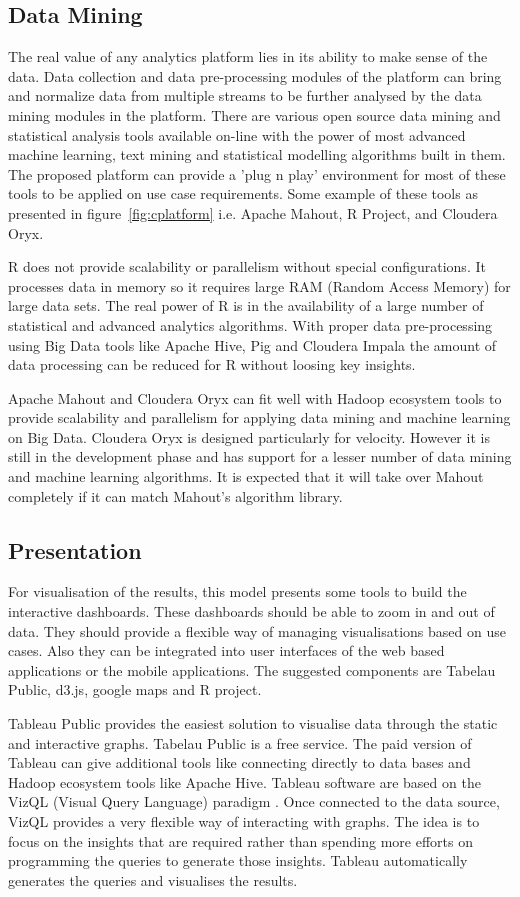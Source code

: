 \subsection{Data Mining}
The real value of any analytics platform lies in its ability to make sense of the data. Data collection and data pre-processing modules of the platform can bring and normalize data from multiple streams to be further analysed by the data mining modules in the platform. There are various open source data mining and statistical analysis tools available on-line with the power of most advanced machine learning, text mining and statistical modelling algorithms built in them.  The proposed platform can provide a 'plug n play' environment for most of these tools to be applied on use case requirements. Some example of these tools as presented in figure~\ref{fig:cplatform} i.e. Apache Mahout, R Project, and Cloudera Oryx. 

R does not provide scalability or parallelism without special configurations. It processes data in memory so it requires large RAM (Random Access Memory) for large data sets. The real power of R is in the availability of a large number of statistical and advanced analytics algorithms. With proper data pre-processing using Big Data tools like Apache Hive, Pig and Cloudera Impala the amount of data processing can be reduced for R without loosing key insights.

 Apache Mahout and Cloudera Oryx can fit well with Hadoop ecosystem tools to provide scalability and parallelism for applying data mining and machine learning on Big Data. Cloudera Oryx is designed particularly for velocity. However it is still in the development phase and has support for a lesser number of data mining and machine learning algorithms. It is expected that it will take over Mahout completely if it can match Mahout's algorithm library.  
\subsection{Presentation}  
For visualisation of the results, this model presents some tools to build the interactive dashboards. These dashboards should be able to zoom in and out of data. They should provide a flexible way of managing visualisations based on use cases. Also they can be integrated into user interfaces of the web based applications or the mobile applications. The suggested components are Tabelau Public, d3.js, google maps and R project.

Tableau Public provides the easiest solution to visualise data through the static and interactive graphs. Tabelau Public is a free service. The paid version of Tableau can give additional tools like connecting directly to data bases and Hadoop ecosystem tools like Apache Hive. Tableau software are based on the VizQL (Visual Query Language) paradigm \cite{hanrahan2006vizql}. Once connected to the data source, VizQL  provides a very flexible way of interacting with graphs. The idea is to focus on the insights that are required rather than spending more efforts on programming the queries to generate those insights. Tableau automatically generates the queries and visualises the results.

